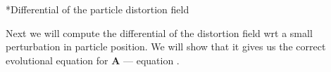 \documentclass[oneside, a4paper, onecolumn, 11pt]{article}
\renewcommand{\AA}{\mathbf{A}}
\newcommand{\PP}{\mathbf{P}}
\newcommand{\vv}{\mathbf{v}}
\newcommand{\xx}{\mathbf{x}}
\newcommand{\XX}{\mathbf{X}}
\newcommand{\diff}{\mathrm{d}}
\newcommand{\QQ}{\mathbf{Q}}
\begin{document}
\begin{section}
\begin{subsection}
    
    
    \newtheorem{MLS_problem}{Lemma: (MLS problem)}
    
\end{subsection}

\begin{subsection}*{Differential of the particle distortion field}
%
 

Next we will compute the differential of the distortion field wrt a small perturbation in particle position.
We will show that it gives us the correct evolutional equation for $\AA$ --- equation .


\end{subsection}
\end{section}
\end{document}

